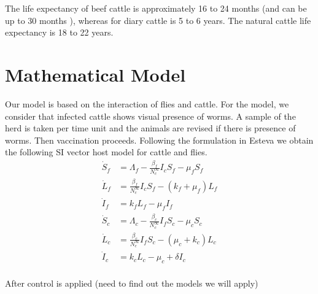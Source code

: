 \documentclass[preprint,12pt]{elsarticle}
\begin{document}
\noindent The life expectancy of beef cattle is approximately 16 to 24 months (and can be up to 30 months \cite{stanley:2003}), whereas for diary cattle is 5 to 6 years. The natural cattle life expectancy is 18 to 22 years.


\section{Mathematical Model}

\noindent Our model is based on the interaction of flies and cattle. For the model, we consider that infected cattle shows visual presence of worms. A sample of the herd is taken per time unit and the animals are revised if there is presence of worms. Then vaccination proceeds.
Following the formulation in Esteva \cite{Esteva:1998} we obtain the
following SI vector host model for cattle and flies.
\begin{equation}\label{Eq:SIvectorhostmodel}
\begin{aligned}
    \dot{S}_f&=
        \Lambda_f-\frac{\beta_f}{N_c^{\infty}}I_cS_f-\mu_fS_f
    \\
    \dot{L}_f&=
        \frac{\beta_f}{N_c^{\infty}}I_cS_f-\left(k_f+\mu_f\right)L_f
    \\
    \dot{I}_f&=
        k_f L_f-\mu_fI_f
    \\
    \dot{S}_c&=
        \Lambda_c-\frac{\beta_c}{N_c^{\infty}}I_fS_c-\mu_cS_c
    \\
    \dot{L}_c&=
        \frac{\beta_c}{N_c^{\infty}}I_fS_c-\left(\mu_c+k_c\right)L_c
    \\
    \dot{I}_c&= k_c L_c-\mu_c +\delta I_c
    \\
\end{aligned}
\end{equation}

\noindent After control is applied (need to find out the models we will apply)
\end{document}
